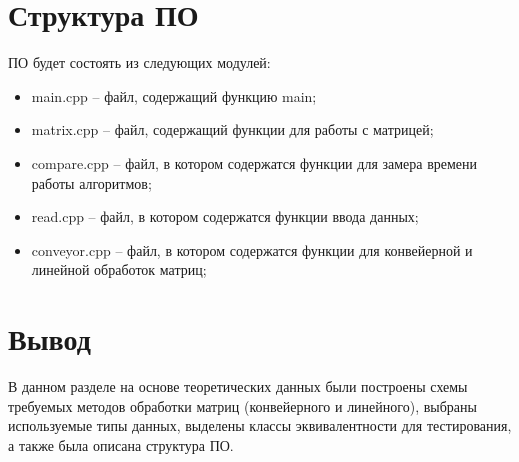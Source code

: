 \clearpage

\section{Структура ПО}

ПО будет состоять из следующих модулей:

\begin{itemize}
	\item main.cpp -- файл, содержащий функцию main;
    \item matrix.cpp -- файл, содержащий функции для работы с матрицей;
    \item compare.cpp -- файл, в котором содержатся функции для замера времени работы алгоритмов;
    \item read.cpp -- файл, в котором содержатся функции ввода данных;
    \item conveyor.cpp -- файл, в котором содержатся функции для конвейерной и линейной обработок матриц;
\end{itemize}

\section{Вывод}

В данном разделе на основе теоретических данных были построены схемы требуемых методов обработки матриц (конвейерного и линейного), выбраны используемые типы данных, выделены классы эквивалентности для тестирования, а также была описана структура ПО.

